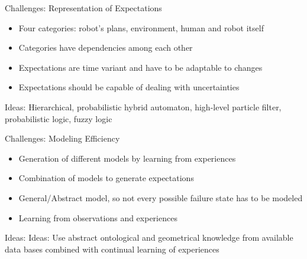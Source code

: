 \documentclass{beamer}
\begin{document}
\label{sec:representation}

\begin{frame}{Challenges: Representation of Expectations}
  \begin{itemize}
  \item Four categories: robot's plans, environment, human and robot itself
  \item Categories have dependencies among each other
  \item Expectations are time variant and have to be adaptable to changes
  \item Expectations should be capable of dealing with uncertainties
  \end{itemize}
  \begin{block}{Ideas:}
    Hierarchical, probabilistic hybrid automaton, high-level particle filter, probabilistic logic, fuzzy logic
  \end{block}
\end{frame}

\label{sec:model}

\begin{frame}{Challenges: Modeling Efficiency}
  \begin{itemize}
  \item Generation of different models by learning from experiences
  \item Combination of models to generate expectations
  \item General/Abstract model, so not every possible failure state has to be modeled
  \item Learning from observations and experiences
  \end{itemize}
  \begin{block}{Ideas:}
  Ideas: Use abstract ontological and geometrical knowledge from available data bases combined with continual learning of experiences
  \end{block}
\end{frame}

\label{sec:execution}
\end{document}
